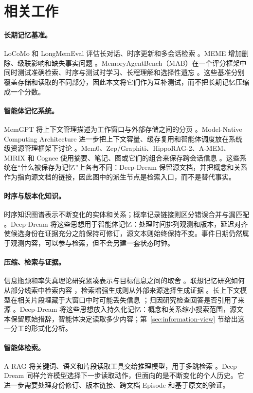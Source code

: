 \section{相关工作}
\label{sec:related-work}

\paragraph{长期记忆基准。}
LoCoMo 和 LongMemEval 评估长对话、时序更新和多会话检索 \citep{maharana2024locomo,wu2025longmemeval}。MEME 增加删除、级联影响和缺失事实问题 \citep{jung2026meme}。MemoryAgentBench（MAB）在一个评分框架中同时测试准确检索、时序与测试时学习、长程理解和选择性遗忘 \citep{hu2025memoryagentbench}。这些基准分别覆盖存储和读取的不同部分，因此本文将它们作为互补测试，而不把长期记忆压缩成一个分数。

\paragraph{智能体记忆系统。}
MemGPT 将上下文管理描述为工作窗口与外部存储之间的分页 \citep{packer2023memgpt}。Model-Native Computing Architecture 进一步把上下文容量、缓存复用和智能体调度放在系统级资源管理框架下讨论 \citep{lin2026icam}。Mem0、Zep/Graphiti、HippoRAG-2、A-MEM、MIRIX 和 Cognee 使用摘要、笔记、图或它们的组合来保存跨会话信息 \citep{chhikara2025mem0,rasmussen2025zep,gutierrez2025hipporag2,xu2025amem,wang2025mirix,markovic2025cognee}。这些系统在“什么被保存为记忆”上各有不同：Deep-Dream 保留源文档，并把概念和关系作为指向源文档的链接，因此图中的派生节点是检索入口，而不是替代事实。

\paragraph{时序与版本化知识。}
时序知识图谱表示不断变化的实体和关系；概率记录链接则区分错误合并与漏匹配 \citep{fellegi1969theory}。Deep-Dream 将这些思想用于智能体记忆：处理时间排列观测和版本，延迟对齐使候选身份在证据充分之前保持可修订，源文本则始终保持不变。事件日期仍然属于观测内容，可以参与检索，但不会另建一套状态时钟。

\paragraph{压缩、检索与证据。}
信息瓶颈和率失真理论研究紧凑表示与目标信息之间的取舍 \citep{tishby2000information,shannon1959coding}。联想记忆研究如何从部分线索中检索内容 \citep{ramsauer2021hopfield}，检索增强生成则从外部来源选择生成证据 \citep{lewis2020rag}。长上下文模型在相关片段埋藏于大窗口中时可能丢失信息 \citep{liu2024lost}；归因研究检查回答是否引用了来源 \citep{gao2023alce}。Deep-Dream 将这些思想放入持久化记忆：概念和关系缩小搜索范围，源文本保留原始措辞，智能体决定读取多少内容；第~\cref{sec:information-view} 节给出这一分工的形式化分析。

\paragraph{智能体检索。}
A-RAG 将关键词、语义和片段读取工具交给推理模型，用于多跳检索 \citep{du2026arag}。Deep-Dream 同样允许模型选择下一步读取动作，但面向的是不断变化的个人历史。它进一步需要处理身份修订、版本链接、跨文档 Episode 和基于原文的验证。
